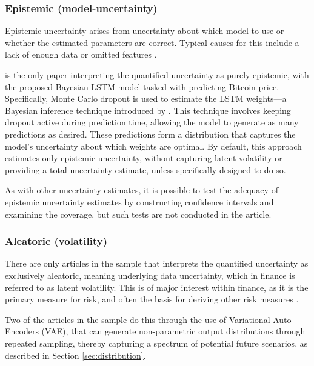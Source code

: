 \subsubsection{Epistemic (model-uncertainty)}
Epistemic uncertainty arises from uncertainty about which model to use or whether the estimated parameters are correct. Typical causes for this include a lack of enough data or omitted features \parencite{hullermeier2021aleatoric}.

\textcite{Hassan2024Bitcoin} is the only paper interpreting the quantified uncertainty as purely epistemic, with the proposed Bayesian LSTM model tasked with predicting Bitcoin price. Specifically, Monte Carlo dropout is used to estimate the LSTM weights—a Bayesian inference technique introduced by \textcite{gal_ghahramani_2015}. This technique involves keeping dropout active during prediction time, allowing the model to generate as many predictions as desired. These predictions form a distribution that captures the model's uncertainty about which weights are optimal. By default, this approach estimates only epistemic uncertainty, without capturing latent volatility or providing a total uncertainty estimate, unless specifically designed to do so.

As with other uncertainty estimates, it is possible to test the adequacy of epistemic uncertainty estimates by constructing confidence intervals and examining the coverage, but such tests are not conducted in the article.


\subsubsection{Aleatoric (volatility)}
There are only \uqaleatoric articles in the sample that interprets the quantified uncertainty as exclusively aleatoric, meaning underlying data uncertainty, which in finance is referred to as latent volatility. This is of major interest within finance, as it is the primary measure for risk, and often the basis for deriving other risk measures \parencite{Brooks2003VolatilityFF}.

Two of the articles in the sample \parencite{arian2022encoded, xing2019sentiment} do this through the use of Variational Auto-Encoders (VAE), that can generate non-parametric output distributions through repeated sampling, thereby capturing a spectrum of potential future scenarios, as described in Section \ref{sec:distribution}.

